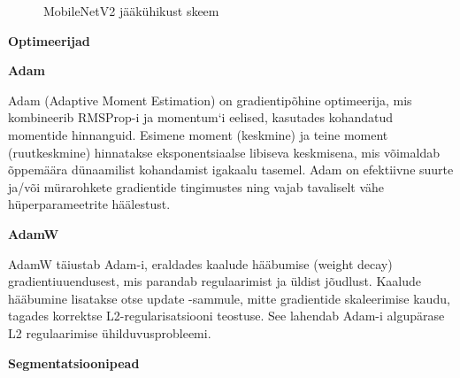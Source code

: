 \begin{figure}[H]
    \centering

    \caption{MobileNetV2 jääkühikust skeem}
    \label{fig:MobileNetV2jääkühikust}
\end{figure}

\textbf{Optimeerijad}

\textbf{Adam}

Adam (Adaptive Moment Estimation) on gradientipõhine optimeerija, mis kombineerib RMSProp-i ja momentum‘i eelised, kasutades kohandatud momentide hinnanguid. Esimene moment (keskmine) ja teine moment (ruutkeskmine) hinnatakse eksponentsiaalse libiseva keskmisena, mis võimaldab õppemäära dünaamilist kohandamist igakaalu tasemel. Adam on efektiivne suurte ja/või mürarohkete gradientide tingimustes ning vajab tavaliselt vähe hüperparameetrite häälestust.

\textbf{AdamW}

AdamW täiustab Adam-i, eraldades kaalude hääbumise (weight decay) gradientiuuendusest, mis parandab regulaarimist ja üldist jõudlust. Kaalude hääbumine lisatakse otse update -sammule, mitte gradientide skaleerimise kaudu, tagades korrektse L2-regularisatsiooni teostuse. See lahendab Adam-i algupärase L2 regulaarimise ühilduvusprobleemi.

\textbf{Segmentatsioonipead}

